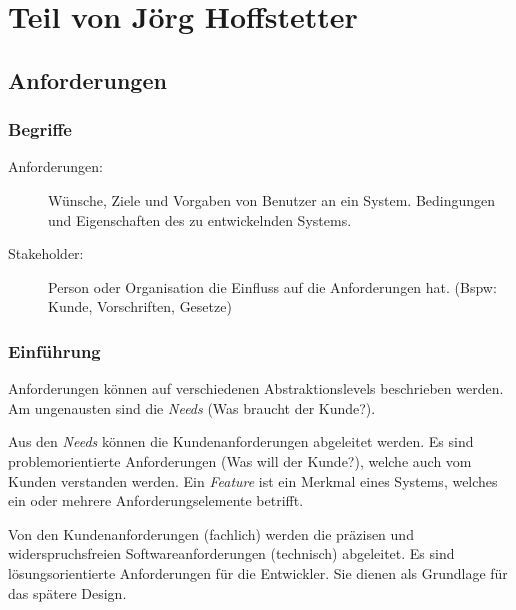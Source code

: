 \chapter{Teil von Jörg Hoffstetter}

\section{Anforderungen}

\subsection{Begriffe}
\begin{description}
	\item[Anforderungen:] Wünsche, Ziele und Vorgaben von Benutzer an ein System. Bedingungen und Eigenschaften des zu entwickelnden Systems.
	\item[Stakeholder:] Person oder Organisation die Einfluss auf die Anforderungen hat. (Bspw: Kunde, Vorschriften, Gesetze)
\end{description}

\subsection{Einführung}

Anforderungen können auf verschiedenen Abstraktionslevels beschrieben werden. Am ungenausten sind die \emph{Needs} (Was braucht der Kunde?).

Aus den \emph{Needs} können die Kundenanforderungen abgeleitet werden. Es sind problemorientierte Anforderungen (Was will der Kunde?), welche auch vom Kunden verstanden werden. Ein \emph{Feature} ist ein Merkmal eines Systems, welches ein oder mehrere Anforderungselemente betrifft.

Von den Kundenanforderungen (fachlich) werden die präzisen und widerspruchsfreien Softwareanforderungen (technisch) abgeleitet. Es sind lösungsorientierte Anforderungen für die Entwickler. Sie dienen als Grundlage für das spätere Design.

